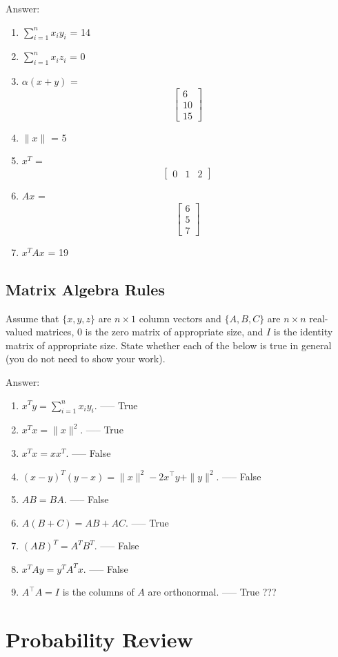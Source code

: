 \documentclass{article}
\def\ans#1{\par\gre{Answer: #1}}
\def\blu#1{{\color{blu}#1}}
\def\gre#1{{\color{gre}#1}}
\def\norm#1{\|#1\|}
\def\enum#1{\begin{enumerate}#1\end{enumerate}}
\begin{document}
\ans{
    \enum{
    \item $\sum_{i=1}^n x_iy_i$ = 14
    \item $\sum_{i=1}^n x_iz_i$ = 0
    \item $\alpha(x+y)$ = \[ \begin{bmatrix} 6 \\ 10 \\ 15 \end{bmatrix} \]
    \item $\norm{x}$ = 5
    \item $x^T$ = \[ \begin{bmatrix} 0 & 1 & 2 \end{bmatrix} \]
    \item $Ax$ = \[ \begin{bmatrix} 6 \\ 5 \\ 7 \end{bmatrix} \]
    \item $x^TAx$ = 19
    }
}


\subsection{Matrix Algebra Rules}

Assume that $\{x,y,z\}$ are $n \times 1$ column vectors and $\{A,B,C\}$ are $n \times n$ real-valued matrices, $0$ is the zero matrix of appropriate size, and $I$ is the identity matrix of appropriate size. \blu{State whether each of the below is true in general} (you do not need to show your work).

\ans{
	\begin{enumerate}
		\item $x^Ty = \sum_{i=1}^n x_iy_i$. ----- True
		\item $x^Tx = \norm{x}^2$. ----- True
		\item $x^Tx = xx^T$. ----- False
		\item $(x-y)^T(y-x) = \norm{x}^2 - 2x^\top y + \norm{y}^2$. ----- False
		\item $AB=BA$. ----- False
		\item $A(B + C) = AB + AC$. ----- True
		\item $(AB)^T = A^TB^T$. ----- False
		\item $x^TAy = y^TA^Tx$. ----- False
		\item $A^\top A = I$ is the columns of $A$ are orthonormal. ----- True ???
	\end{enumerate}
}


\section{Probability Review}
\end{document}
